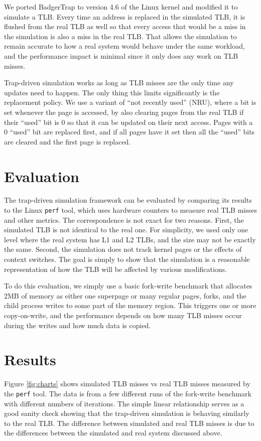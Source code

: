 We ported BadgerTrap to version 4.6 of the Linux kernel and modified it to simulate a TLB. Every time an address is replaced in the simulated TLB, it is flushed from the real TLB as well so that every access that would be a miss in the simulation is also a miss in the real TLB. That allows the simulation to remain accurate to how a real system would behave under the same workload, and the performance impact is minimal since it only does any work on TLB misses.

Trap-driven simulation works as long as TLB misses are the only time any updates need to happen. The only thing this limits significantly is the replacement policy. We use a variant of ``not recently used'' (NRU), where a bit is set whenever the page is accessed, by also clearing pages from the real TLB if their ``used'' bit is 0 so that it can be updated on their next access. Pages with a 0 ``used'' bit are replaced first, and if all pages have it set then all the ``used'' bits are cleared and the first page is replaced.

\section{Evaluation}
The trap-driven simulation framework can be evaluated by comparing its results to the Linux \verb|perf| tool, which uses hardware counters to measure real TLB misses and other metrics. The correspondence is not exact for two reasons. First, the simulated TLB is not identical to the real one. For simplicity, we used only one level where the real system has L1 and L2 TLBs, and the size may not be exactly the same. Second, the simulation does not track kernel pages or the effects of context switches. The goal is simply to show that the simulation is a reasonable representation of how the TLB will be affected by various modifications.

To do this evaluation, we simply use a basic fork-write benchmark that allocates 2MB of memory as either one superpage or many regular pages, forks, and the child process writes to some part of the memory region. This triggers one or more copy-on-write, and the performance depends on how many TLB misses occur during the writes and how much data is copied.

\section{Results}

Figure \ref{fig:charts} shows simulated TLB misses vs real TLB misses measured by the \verb|perf| tool. The data is from a few different runs of the fork-write benchmark with different numbers of iterations. The simple linear relationship serves as a good sanity check showing that the trap-driven simulation is behaving similarly to the real TLB. The difference between simulated and real TLB misses is due to the differences between the simulated and real system discussed above.

